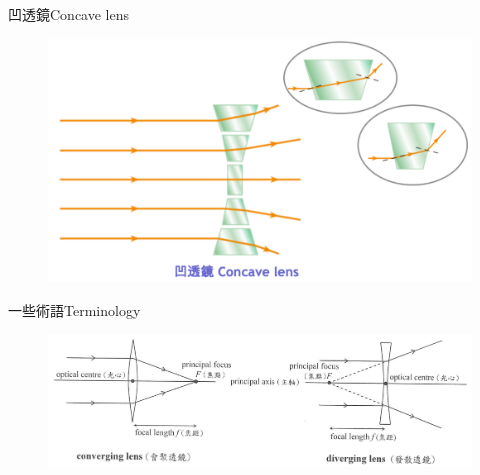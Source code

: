 \documentclass[beamer=true]{standalone}
\begin{document}
\begin{frame}{凹透鏡Concave lens}
    \begin{figure}
        \centering
        \includegraphics[width=1\linewidth]{assets/n8uxe892e.png}
    \end{figure}
\end{frame}

\begin{frame}{一些術語Terminology}
    \begin{figure}
        \centering
        \includegraphics[width=1\linewidth]{assets/nxu98ru393n28urnc23.png}
    \end{figure}
\end{frame}
\end{document}
